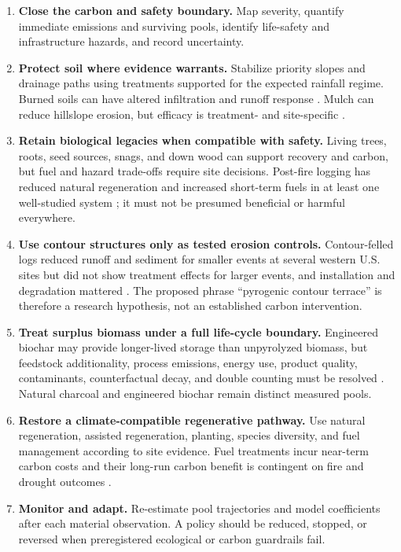 \documentclass[10pt]{article}
\begin{document}
\begin{enumerate}
\item \textbf{Close the carbon and safety boundary.}  Map severity, quantify
immediate emissions and surviving pools, identify life-safety and infrastructure
hazards, and record uncertainty.
\item \textbf{Protect soil where evidence warrants.}  Stabilize priority
slopes and drainage paths using treatments supported for the expected rainfall
regime.  Burned soils can have altered infiltration and runoff response
\cite{ebel2017}.  Mulch can reduce hillslope erosion, but efficacy is treatment-
and site-specific \cite{robichaud2013}.
\item \textbf{Retain biological legacies when compatible with safety.}  Living
trees, roots, seed sources, snags, and down wood can support recovery and carbon,
but fuel and hazard trade-offs require site decisions.  Post-fire logging has
reduced natural regeneration and increased short-term fuels in at least one
well-studied system \cite{donato2006}; it must not be presumed beneficial or
harmful everywhere.
\item \textbf{Use contour structures only as tested erosion controls.}
Contour-felled logs reduced runoff and sediment for smaller events at several
western U.S. sites but did not show treatment effects for larger events, and
installation and degradation mattered \cite{robichaud2008}.  The proposed
phrase ``pyrogenic contour terrace'' is therefore a research hypothesis, not an
established carbon intervention.
\item \textbf{Treat surplus biomass under a full life-cycle boundary.}
Engineered biochar may provide longer-lived storage than unpyrolyzed biomass,
but feedstock additionality, process emissions, energy use, product quality,
contaminants, counterfactual decay, and double counting must be resolved
\cite{lehmann2021}.  Natural charcoal and engineered biochar remain distinct
measured pools.
\item \textbf{Restore a climate-compatible regenerative pathway.}  Use natural
regeneration, assisted regeneration, planting, species diversity, and fuel
management according to site evidence.  Fuel treatments incur near-term carbon
costs and their long-run carbon benefit is contingent on fire and drought
outcomes \cite{foster2020,loudermilk2017}.
\item \textbf{Monitor and adapt.}  Re-estimate pool trajectories and model
coefficients after each material observation.  A policy should be reduced,
stopped, or reversed when preregistered ecological or carbon guardrails fail.
\end{enumerate}
\end{document}
